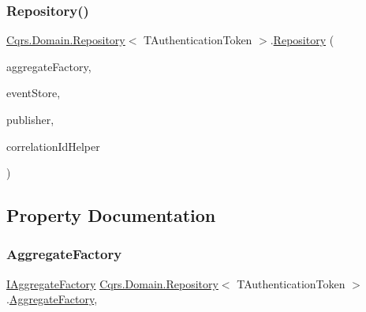 \subsubsection{\texorpdfstring{Repository()}{Repository()}}
{\footnotesize\ttfamily \hyperlink{classCqrs_1_1Domain_1_1Repository}{Cqrs.\+Domain.\+Repository}$<$ T\+Authentication\+Token $>$.\hyperlink{classCqrs_1_1Domain_1_1Repository}{Repository} (\begin{DoxyParamCaption}\item[{\hyperlink{interfaceCqrs_1_1Domain_1_1Factories_1_1IAggregateFactory}{I\+Aggregate\+Factory}}]{aggregate\+Factory,  }\item[{\hyperlink{interfaceCqrs_1_1Events_1_1IEventStore}{I\+Event\+Store}$<$ T\+Authentication\+Token $>$}]{event\+Store,  }\item[{\hyperlink{interfaceCqrs_1_1Events_1_1IEventPublisher}{I\+Event\+Publisher}$<$ T\+Authentication\+Token $>$}]{publisher,  }\item[{I\+Correlation\+Id\+Helper}]{correlation\+Id\+Helper }\end{DoxyParamCaption})}



\subsection{Property Documentation}
\mbox{\label{classCqrs_1_1Domain_1_1Repository_a02cee15b1d3f603c1ae437b366e83085_a02cee15b1d3f603c1ae437b366e83085}} 
\subsubsection{\texorpdfstring{Aggregate\+Factory}{AggregateFactory}}
{\footnotesize\ttfamily \hyperlink{interfaceCqrs_1_1Domain_1_1Factories_1_1IAggregateFactory}{I\+Aggregate\+Factory} \hyperlink{classCqrs_1_1Domain_1_1Repository}{Cqrs.\+Domain.\+Repository}$<$ T\+Authentication\+Token $>$.\hyperlink{classCqrs_1_1Domain_1_1Factories_1_1AggregateFactory}{Aggregate\+Factory}\hspace{0.3cm}{\ttfamily [get]}, {\ttfamily [protected]}}

\mbox{\label{classCqrs_1_1Domain_1_1Repository_a3504ed9a3ff1c689ba89c574619893af_a3504ed9a3ff1c689ba89c574619893af}} 
